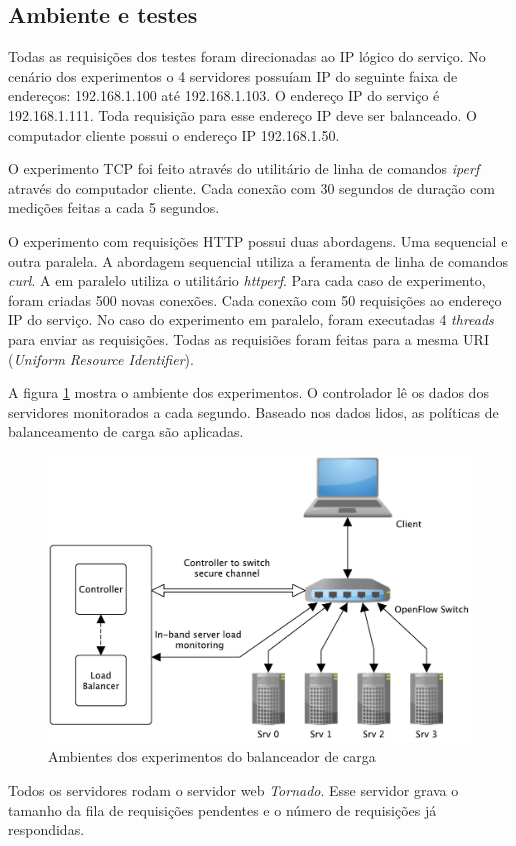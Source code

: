 \subsection{Ambiente e testes}

Todas as requisições dos testes foram direcionadas ao IP lógico do 
serviço.
No cenário dos experimentos o 4 servidores possuíam IP do seguinte faixa de 
endereços: 192.168.1.100 até 192.168.1.103.
O endereço IP do serviço é 192.168.1.111.
Toda requisição para esse endereço IP deve ser balanceado.
O computador cliente possui o endereço IP 192.168.1.50.

O experimento TCP foi feito através do utilitário de linha de comandos 
\emph{iperf} através do computador cliente.
Cada conexão com 30 segundos de duração com medições feitas a cada 5 segundos.

O experimento com requisições HTTP possui duas abordagens.
Uma sequencial e outra paralela.
A abordagem sequencial utiliza a feramenta de linha de comandos \emph{curl}.
A em paralelo utiliza o utilitário \emph{httperf}.
Para cada caso de experimento, foram criadas 500 novas conexões.
Cada conexão com 50 requisições ao endereço IP do serviço.
No caso do experimento em paralelo, foram executadas 4 \emph{threads} para 
enviar as requisições.
Todas as requisiões foram feitas para a mesma URI (\emph{Uniform Resource
Identifier}).

A figura \ref{fig:testbed} mostra o ambiente dos experimentos.
O controlador lê os dados dos servidores monitorados a cada segundo.
Baseado nos dados lidos, as políticas de balanceamento de carga são aplicadas.

\begin{figure}[htb!]
    \centering
    \includegraphics[width=\linewidth]{img/balancer-testbed-img}
    \caption{Ambientes dos experimentos do balanceador de carga}
    \label{fig:testbed}
\end{figure}

Todos os servidores rodam o servidor web \emph{Tornado}\citep{tornado}. 
Esse servidor grava o tamanho da fila de requisições pendentes e o número de 
requisições já respondidas.
